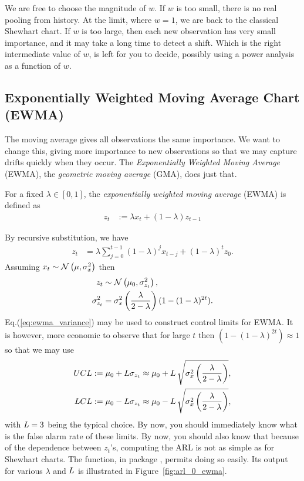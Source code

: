 We are free to choose the magnitude of $w$. 
If $w$ is too small, there is no real pooling from history. At the limit, where $w=1$, we are back to the classical Shewhart chart. 
If $w$ is too large, then each new observation has very small importance, and it may take a long time to detect a shift.
Which is the right intermediate value of $w$, is left for you to decide, possibly using a power analysis as a function of $w$. 






\subsection{Exponentially Weighted Moving Average Chart (EWMA)}
The moving average gives all observations the same importance. 
We want to change this, giving more importance to new observations so that we may capture drifts quickly when they occur. 
The \emph{Exponentially Weighted Moving Average} (EWMA), \aka the \emph{geometric moving average} (GMA), does just that. 
\begin{definition}[EWMA]
For a fixed $\lambda \in [0,1]$, the \emph{exponentially weighted moving average} (EWMA) is defined as 
\begin{align}
	z_t &:= \lambda x_t + (1-\lambda) z_{t-1}
\end{align}
\end{definition}
By recursive substitution, we have 
\begin{align}
	z_t &= \lambda \sum_{j=0}^{t-1} (1-\lambda)^j x_{t-j} + (1-\lambda)^t z_0.
\end{align}
Assuming $x_t \sim \mathcal{N}\left(\mu, \sigma_x^2\right)$ then  
\begin{align}
\label{eq:ewma_variance}
	z_t &\sim \mathcal{N}\left(\mu_0,	\sigma^2_{z_t} \right), \\
	\sigma^2_{z_t} &= \sigma^2_x \left( \frac{\lambda}{2-\lambda} \right)(1-(1-\lambda)^{2t}).
\end{align}
Eq.(\ref{eq:ewma_variance}) may be used to construct control limits for EWMA.
It is however, more economic to observe that for large $t$ then  $(1-(1-\lambda)^{2t}) \approx 1$ so that we may use 
\begin{align}
\begin{split}
\label{eq:ewma_variance_approximate}
	UCL &:= \mu_0 + L \sigma_{z_t} \approx \mu_0 + L \, \sqrt{\sigma^2_x\left( \frac{\lambda}{2-\lambda} \right)},  \\
	LCL &:= \mu_0 - L \sigma_{z_t} \approx \mu_0 - L \, \sqrt{\sigma^2_x\left( \frac{\lambda}{2-\lambda} \right)},
\end{split}
\end{align}
with $L=3$ being the typical choice.
By now, you should immediately know what is the false alarm rate of these limits.
By now, you should also know that because of the dependence between $z_t$'s, computing the ARL is not as simple as for Shewhart charts. The  \R function, in package , permits doing so easily. 
Its output for various $\lambda$ and $L$ is illustrated in Figure~\ref{fig:arl_0_ewma}.

